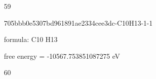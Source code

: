\documentclass{article}
\begin{document}
59

\vspace{1cm}


705bbb0e5307bd961891ae2334cee3dc-C10H13-1-1



formula: C10 H13



free energy = -10567.753851087275 eV

60
\end{document}
